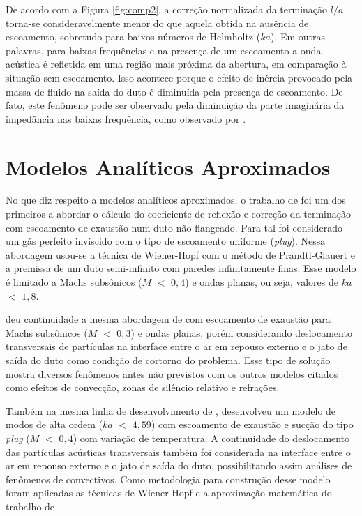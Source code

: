 \newpage
De acordo com a Figura \ref{fig:comp2}, a correção normalizada da terminação $l/a$ torna-se consideravelmente menor do que aquela obtida na ausência de escoamento, sobretudo para baixos números de Helmholtz ($ka$). Em outras palavras, para baixas frequências e na presença de um escoamento a onda acústica é refletida em uma região mais próxima da abertura, em comparação à situação sem escoamento. Isso acontece porque o efeito de inércia provocado pela massa de fluido na saída do duto é diminuída pela presença de escoamento. De fato, este fenômeno pode ser observado pela diminuição da parte imaginária da impedância nas baixas frequência, como observado por .

\section{Modelos Analíticos Aproximados}

No que diz respeito a modelos analíticos aproximados, o trabalho de  foi um dos primeiros a abordar o cálculo do coeficiente de reflexão e correção da terminação com escoamento de exaustão num duto não flangeado. Para tal foi considerado um gás perfeito invíscido com o tipo de escoamento uniforme (\textit{plug}). Nessa abordagem usou-se a técnica de Wiener-Hopf com o método de Prandtl-Glauert e a premissa de um duto semi-infinito com paredes infinitamente finas. Esse modelo é limitado a Machs subsônicos ($M$ $<$ $0,4$) e ondas planas, ou seja, valores de $ka$ $<$ $1,8$.

 deu continuidade a mesma abordagem de  com escoamento de exaustão para Machs subsônicos ($M$ $<$ $0,3$) e ondas planas, porém considerando deslocamento transversais de partículas na interface entre o ar em repouso externo e o jato de saída do duto como condição de cortorno do problema. Esse tipo de solução mostra diversos fenômenos antes não previstos com os outros modelos citados como efeitos de convecção, zonas de silêncio relativo e refrações.

Também na mesma linha de desenvolvimento de ,  desenvolveu um modelo de modos de alta ordem ($ka$ $<$ $4,59$) com escoamento de exaustão e sucção do tipo \textit{plug} ($M$ $<$ $0,4$) com variação de temperatura. A continuidade do deslocamento das partículas acústicas transversais também foi considerada na interface entre o ar em repouso externo e o jato de saída do duto, possibilitando assim análises de fenômenos de convectivos. Como metodologia para construção desse modelo foram aplicadas as técnicas de Wiener-Hopf e a aproximação matemática do trabalho de .

